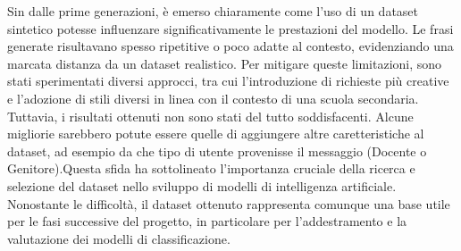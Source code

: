 Sin dalle prime generazioni, è emerso chiaramente come l’uso di un dataset sintetico potesse influenzare significativamente le prestazioni del modello. Le frasi generate risultavano spesso ripetitive o poco adatte al contesto, evidenziando una marcata distanza da un dataset realistico. Per mitigare queste limitazioni, sono stati sperimentati diversi approcci, tra cui l’introduzione di richieste più creative e l’adozione di stili diversi in linea con il contesto di una scuola secondaria. Tuttavia, i risultati ottenuti non sono stati del tutto soddisfacenti. Alcune migliorie sarebbero potute essere quelle di aggiungere altre caretteristiche al dataset, ad esempio da che tipo di utente provenisse il messaggio (Docente o Genitore).Questa sfida ha sottolineato l’importanza cruciale della ricerca e selezione del dataset nello sviluppo di modelli di intelligenza artificiale. Nonostante le difficoltà, il dataset ottenuto rappresenta comunque una base utile per le fasi successive del progetto, in particolare per l'addestramento e la valutazione dei modelli di classificazione.